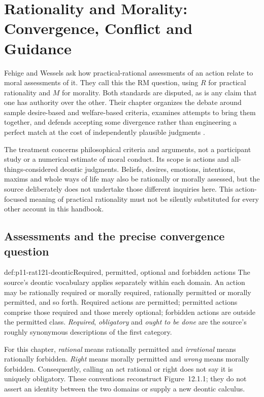 \chapter{Rationality and Morality: Convergence, Conflict and Guidance}
\label{sec:p11-rationality-12-1}

Fehige and Wessels ask how practical-rational assessments of an action
relate to moral assessments of it. They call this the RM question,
using \(R\) for practical rationality and \(M\) for morality.
Both standards are disputed, as is any claim that one has authority
over the other. Their chapter organizes the debate around sample
desire-based and welfare-based criteria, examines attempts to bring
them together, and defends accepting some divergence rather than
engineering a perfect match at the cost of independently plausible
judgments \parencite[chap.~12.1, pp.~681--692]{FehigeWessels2021Morality}.

The treatment concerns philosophical criteria and arguments, not a
participant study or a numerical estimate of moral conduct. Its scope
is actions and all-things-considered deontic judgments. Beliefs,
desires, emotions, intentions, maxims and whole ways of life may also
be rationally or morally assessed, but the source deliberately does
not undertake those different inquiries here. This action-focused
meaning of practical rationality must not be silently substituted for
every other account in this handbook.

\section{Assessments and the precise convergence question}
\label{sec:p11-rat121-assessment}

\begin{hbdefinition}{def:p11-rat121-deontic}{Required, permitted, optional and forbidden actions}
The source's deontic vocabulary applies separately within each domain.
An action may be rationally required or morally required, rationally
permitted or morally permitted, and so forth. Required actions are
permitted; permitted actions comprise those required and those merely
optional; forbidden actions are outside the permitted class.
\emph{Required}, \emph{obligatory} and \emph{ought to be done}
are the source's roughly synonymous descriptions of the first category.

For this chapter, \emph{rational} means rationally permitted and
\emph{irrational} means rationally forbidden. \emph{Right} means
morally permitted and \emph{wrong} means morally forbidden.
Consequently, calling an act rational or right does not say it is
uniquely obligatory. These conventions reconstruct Figure~12.1.1;
they do not assert an identity between the two domains or supply
a new deontic calculus.
\end{hbdefinition}

